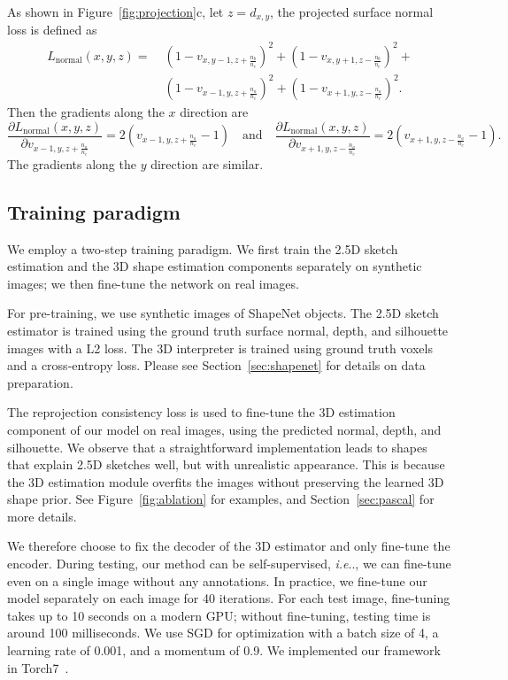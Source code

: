 \documentclass{article}
\makeatletter
\newcommand{\sect}[1]{Section~\ref{#1}}
\newcommand{\fig}[1]{Figure~\ref{#1}}
\DeclareRobustCommand\onedot{\futurelet\@let@token\@onedot}
\def\@onedot{\ifx\@let@token.\else.\null\fi\xspace}
\def\ie{\emph{i.e}\onedot} \def\Ie{\emph{I.e}\onedot}
\makeatother
\begin{document}
As shown in \fig{fig:projection}c, let $z = d_{x, y}$, the projected surface normal loss is defined as
\begin{align}
    L_\text{normal}(x, y, z) = \;& 
			\left(1 - v_{x, y - 1, z + \frac{n_b}{n_c}}\right) ^ 2 +
			\left(1 - v_{x, y + 1, z - \frac{n_b}{n_c}}\right) ^ 2 +  \nonumber \\
			&\left(1 - v_{x - 1, y, z + \frac{n_a}{n_c}}\right) ^ 2 +
			\left(1 - v_{x + 1, y, z - \frac{n_a}{n_c}}\right) ^ 2.
\end{align}
Then the gradients along the $x$ direction are
\begin{equation}
	\frac{\partial{L_\text{normal}(x, y, z)}}{\partial{v_{x - 1, y, z + \frac{n_a}{n_c}}}} = 2 \left(v_{x - 1, y, z + \frac{n_a}{n_c}} - 1\right)
\quad\text{and}\quad
	\frac{\partial{L_\text{normal}(x, y, z)}}{\partial{v_{x + 1, y, z - \frac{n_a}{n_c}}}} = 2 \left(v_{x + 1, y, z - \frac{n_a}{n_c}} - 1\right).
\end{equation}
The gradients along the $y$ direction are similar.

\subsection{Training paradigm}
\label{sec:train}

We employ a two-step training paradigm. We first train the 2.5D sketch estimation and the 3D shape estimation components separately on synthetic images; we then fine-tune the network on real images.

For pre-training, we use synthetic images of ShapeNet objects. The 2.5D sketch estimator is trained using the ground truth surface normal, depth, and silhouette images with a L2 loss. The 3D interpreter is trained using ground truth voxels and a cross-entropy loss. Please see \sect{sec:shapenet} for details on data preparation. 

The reprojection consistency loss is used to fine-tune the 3D estimation component of our model on real images, using the predicted normal, depth, and silhouette. We observe that a straightforward implementation leads to shapes that explain 2.5D sketches well, but with unrealistic appearance. This is because the 3D estimation module overfits the images without preserving the learned 3D shape prior. See \fig{fig:ablation} for examples, and \sect{sec:pascal} for more details.

We therefore choose to fix the decoder of the 3D estimator and only fine-tune the encoder. During testing, our method can be self-supervised, \ie, we can fine-tune even on a single image without any annotations. In practice, we fine-tune our model separately on each image for 40 iterations. For each test image, fine-tuning takes up to 10 seconds on a modern GPU; without fine-tuning, testing time is around 100 milliseconds. We use SGD for optimization with a batch size of 4, a learning rate of 0.001, and a momentum of 0.9. We implemented our framework in Torch7~\citep{Collobert2011}. 
\end{document}
